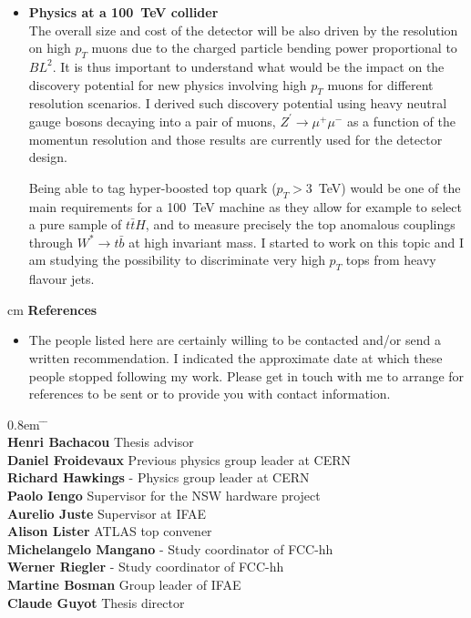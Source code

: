 \documentclass[12pt]{article}
\begin{document}
\begin{itemize}[leftmargin=1.3cm]
\item[] {\bf Physics at a 100~TeV collider}\\
The overall size and cost of the detector will be also driven by the resolution on high $p_T$ muons due to the charged particle bending power proportional to $BL^2$.
It is thus important to understand what would be the impact on the discovery potential for new physics involving high $p_T$ muons for different resolution scenarios. 
I derived such discovery potential using heavy neutral gauge bosons decaying into a pair of muons, $Z^{\prime} \rightarrow \mu^{+}\mu^{-}$ as a function of the momentun resolution 
and those results are currently used for the detector design.
 \vspace{2.5mm}

Being able to tag hyper-boosted top quark ($p_T > 3$~TeV) would be one of the main requirements for a 100~TeV machine as they allow for example to select a pure 
sample of $t\bar{t}H$, and to measure precisely the top anomalous couplings through $W^* \rightarrow t\bar{b}$ at high invariant mass.
I started to work on this topic and I am studying  the possibility to discriminate very high $p_T$ tops from heavy flavour jets.

\end{itemize}







 cm
{\bf \large References}
\vskip 0.2cm
\begin{itemize}[leftmargin=1.3cm]
\item[] The people listed here are certainly willing to be contacted and/or send a written recommendation. I indicated the approximate date at which these people stopped following my work.
Please get in touch with me to arrange for references to be sent or to provide you with contact information.
\end{itemize}

\begin{tabbing}
\itemsep0.8em
 \hskip 1.3cm  \=  \hskip 5.3cm \=  \hskip 1.5cm  \=\\ 
\> {\bf Henri Bachacou}   \> Thesis advisor  \\
\> {\bf Daniel Froidevaux}   \> Previous physics group leader at CERN  \\
\> {\bf Richard Hawkings}  \> - \>  Physics group leader at CERN\\
\> {\bf Paolo Iengo}   \>  Supervisor for the NSW hardware project\\
\> {\bf Aurelio Juste}   \>  Supervisor at IFAE\\
\> {\bf Alison Lister}   \>  ATLAS top convener \\
\> {\bf Michelangelo Mangano}  \> - \> Study coordinator of FCC-hh\\
\> {\bf Werner Riegler}  \> - \> Study coordinator of FCC-hh\\
\> {\bf Martine Bosman}   \>  Group leader of IFAE \\
\> {\bf Claude Guyot}  \>  Thesis director  

\end{tabbing}
\end{document}
